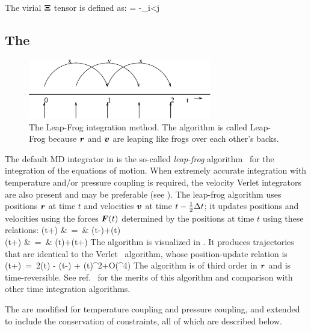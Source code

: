 The virial ${\bf \Xi}$ tensor is defined as:
\beq
{\bf \Xi} = -\half \sum_{i<j} \rvij \otimes \Fvij 
\label{eqn:Xi}
\eeq



\subsection{The }
\label{subsec:update}
\begin{figure}
\centerline{\includegraphics[width=8cm]{plots/leapfrog}}
\caption[The Leap-Frog integration method.]{The Leap-Frog integration method. The algorithm is called Leap-Frog because $\ve{r}$ and $\ve{v}$ are leaping
like  frogs over each other's backs.}
\label{fig:leapfrog}
\end{figure}

The default MD integrator in {\gromacs} is the so-called {\em leap-frog} 
algorithm~\cite{Hockney74} for the integration of the equations of
motion.  When extremely accurate integration with temperature
and/or pressure coupling is required, the velocity Verlet integrators
are also present and may be preferable (see ). The leap-frog
algorithm uses positions $\ve{r}$ at time $t$ and
velocities $\ve{v}$ at time $t-\hDt$; it updates positions and
velocities using the forces
$\ve{F}(t)$ determined by the positions at time $t$ using these relations:
\bea
\label{eqn:leapfrogv}
(t+\hDt)  &~=~&   (t-\hDt)+(t)   \\
(t+\Dt)   &~=~&   (t)+\Dt{}(t+\hDt)
\eea
The algorithm is visualized in .
It produces trajectories that are identical to the Verlet~\cite{Verlet67} algorithm,
whose position-update relation is
\beq
{}(t+\Dt)~=~2(t) - (t-\Dt) + (t)\Dt^2+O(\Dt^4)
\eeq
The algorithm is of third order in $\ve{r}$ and is time-reversible.
See ref.~\cite{Berendsen86b} for the merits of this algorithm and comparison
with other time integration algorithms.

The  are modified for temperature
coupling and pressure coupling, and extended to include the
conservation of constraints, all of which are described below.  


